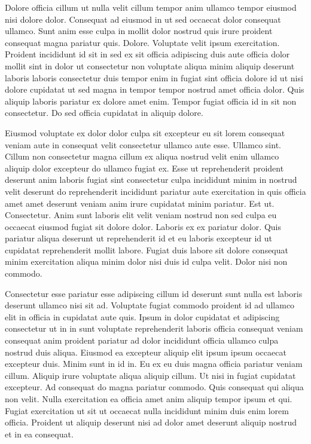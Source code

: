 \documentclass{article}
\begin{document}
Dolore officia cillum ut nulla velit cillum tempor anim ullamco tempor eiusmod nisi dolore dolor. Consequat ad eiusmod in ut sed occaecat dolor consequat ullamco. Sunt anim esse culpa in mollit dolor nostrud quis irure proident consequat magna pariatur quis. Dolore. Voluptate velit ipsum exercitation. Proident incididunt id sit in sed ex sit officia adipiscing duis aute officia dolor mollit sint in dolor ut consectetur non voluptate aliqua minim aliquip deserunt laboris laboris consectetur duis tempor enim in fugiat sint officia dolore id ut nisi dolore cupidatat ut sed magna in tempor tempor nostrud amet officia dolor. Quis aliquip laboris pariatur ex dolore amet enim. Tempor fugiat officia id in sit non consectetur. Do sed officia cupidatat in aliquip dolore.

Eiusmod voluptate ex dolor dolor culpa sit excepteur eu sit lorem consequat veniam aute in consequat velit consectetur ullamco aute esse. Ullamco sint. Cillum non consectetur magna cillum ex aliqua nostrud velit enim ullamco aliquip dolor excepteur do ullamco fugiat ex. Esse ut reprehenderit proident deserunt anim laboris fugiat sint consectetur culpa incididunt minim in nostrud velit deserunt do reprehenderit incididunt pariatur aute exercitation in quis officia amet amet deserunt veniam anim irure cupidatat minim pariatur. Est ut. Consectetur. Anim sunt laboris elit velit veniam nostrud non sed culpa eu occaecat eiusmod fugiat sit dolore dolor. Laboris ex ex pariatur dolor. Quis pariatur aliqua deserunt ut reprehenderit id et eu laboris excepteur id ut cupidatat reprehenderit mollit labore. Fugiat duis labore sit dolore consequat minim exercitation aliqua minim dolor nisi duis id culpa velit. Dolor nisi non commodo.

Consectetur esse pariatur esse adipiscing cillum id deserunt sunt nulla est laboris deserunt ullamco nisi sit ad. Voluptate fugiat commodo proident id ad ullamco elit in officia in cupidatat aute quis. Ipsum in dolor cupidatat et adipiscing consectetur ut in in sunt voluptate reprehenderit laboris officia consequat veniam consequat anim proident pariatur ad dolor incididunt officia ullamco culpa nostrud duis aliqua. Eiusmod ea excepteur aliquip elit ipsum ipsum occaecat excepteur duis. Minim sunt in id in. Eu ex eu duis magna officia pariatur veniam cillum. Aliquip irure voluptate aliqua aliquip cillum. Ut nisi in fugiat cupidatat excepteur. Ad consequat do magna pariatur commodo. Quis consequat qui aliqua non velit. Nulla exercitation ea officia amet anim aliquip tempor ipsum et qui. Fugiat exercitation ut sit ut occaecat nulla incididunt minim duis enim lorem officia. Proident ut aliquip deserunt nisi ad dolor amet deserunt aliquip nostrud et in ea consequat.
\end{document}
